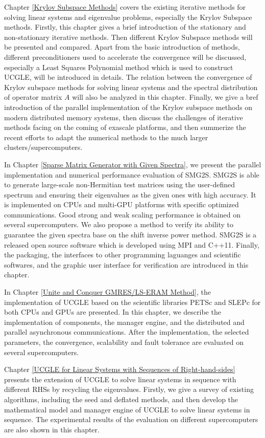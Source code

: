 Chapter \ref{Krylov Subspace Methods} covers the existing iterative methods for solving linear systems and eigenvalue problems, especially the Krylov Subspace methods. Firstly, this chapter gives a brief introduction of the stationary and non-stationary iterative methods. Then different Krylov Subspace methods will be presented and compared. Apart from the basic introduction of methods, different preconditioners used to accelerate the convergence will be discussed, especially a Least Squares Polynomial method which is used to construct UCGLE, will be introduced in details. The relation between the convergence of Krylov subspace methods for solving linear systems and the spectral distribution of operator matrix $A$ will also be analyzed in this chapter. Finally, we give a bref introduction of the parallel implementation of the Krylov subspace methods on modern distributed memory systems, then discuss the challenges of iterative methods facing on the coming of exascale platforms, and then summerize the recent efforts to adapt the numerical methods to the much larger clusters/supercomputers.

In Chapter \ref{Sparse Matrix Generator with Given Spectra}, we present the parallel implementation and numerical performance evaluation of SMG2S.  SMG2S is able to generate large-scale non-Hermitian test matrices using the user-defined spectrum and ensuring their eigenvalues as the given ones with high accuracy. It is implemented on CPUs and multi-GPU platforms with specific optimized communications. Good strong and weak scaling performance is obtained on several supercomputers. We also propose a method to verify its ability to guarantee the given spectra base on the shift inverse power method. SMG2S is a released open source software which is developed using MPI and C++11. Finally, the packaging, the interfaces to other programming laguanges and scientific softwares, and the graphic user interface for verification are introduced in this chapter.

In Chapter \ref{Unite and Conquer GMRES/LS-ERAM Method}, the implementation of UCGLE based on the scientific libraries PETSc and SLEPc for both CPUs and GPUs are presented. In this chapter, we describe the implementation of components, the manager engine, and the distributed and parallel asynchronous communications. After the implementation, the selected parameters, the convergence, scalability and fault tolerance are evaluated on several supercomputers.

Chapter \ref{UCGLE for Linear Systems with Sequences of Right-hand-sides} presents the extension of UCGLE to solve linear systems in sequence with different RHSs by recycling the eigenvalues. Firstly, we give a survey of existing algorithms, including the seed and deflated methods, and then develop the mathematical model and manager engine of UCGLE to solve linear systems in sequence. The experimental results of the evaluation on different supercomputers are also shown in this chapter.

